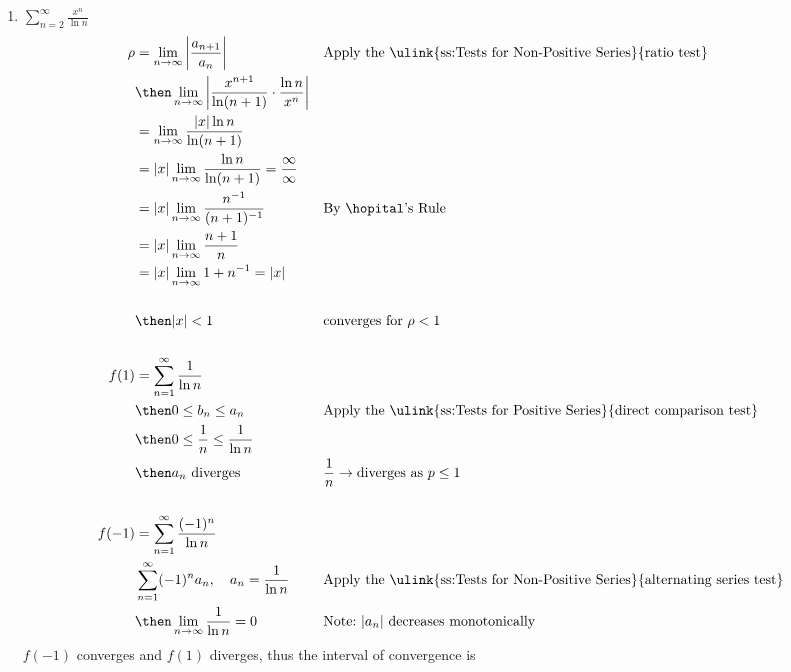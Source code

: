 \begin{enumerate}[itemsep=24em]
\newpage %

  \item \(\displaystyle \sum_{n=2}^{\infty} \frac{x^n}{\ln n} \)
    \begin{align*}
      \rho &= \lim_{n \to \infty} \left| \frac{a_{n+1}}{a_n}  \right|
           && \text{Apply the \ulink{ss:Tests for Non-Positive Series}{ratio test}} \\
      &\then \lim_{n \to \infty}
      \left| \frac{x^{n+1}}{\ln(n+1)} \cdot \frac{\ln n}{x^n}  \right| \\
      &= \lim_{n \to \infty}
     \frac{|x| \ln n}{\ln(n+1)} \\
      &= |x| \lim_{n \to \infty}
      \frac{\ln n}{\ln(n+1)}  = \frac{\infty}{\infty}\\
      &= |x| \lim_{n \to \infty} \frac{n^{-1}}{(n+1)^{-1}}
      && \text{By \hopital's Rule} \\
      &= |x| \lim_{n \to \infty} \frac{n+1}{n} \\
      &= |x| \lim_{n \to \infty} 1+n^{-1} = |x| \\
      \\
      &\then |x| < 1
      && \text{converges for}~\rho < 1 \\
      \\
      f(1) &= \sum_{n=1}^{\infty} \frac{1}{\ln n} \\
      &\then 0 \leq b_n \leq a_n
           && \text{Apply the \ulink{ss:Tests for Positive Series}{direct comparison test}} \\
      &\then 0 \leq \frac{1}{n} \leq \frac{1}{\ln n} \\
      &\then a_n ~\text{diverges}
      && \frac{1}{n} \to \text{diverges as } p \leq 1 \\
      \\
      f(-1) &= \sum_{n=1}^{\infty} \frac{(-1)^n}{\ln n} \\
      &\sum_{n=1}^{\infty} (-1)^n a_n, \quad a_n = \frac{1}{\ln n}
      && \text{Apply the \ulink{ss:Tests for Non-Positive Series}{alternating series test}} \\
      &\then \lim_{n \to \infty} \frac{1}{\ln n} = 0
      && \text{Note:}~|a_n| ~\text{decreases monotonically}\\
    \end{align*}
     \(f(-1)\) converges and \(f(1)\) diverges, thus the interval of convergence
    is \aset{\([-1,1)\)}


\end{enumerate}
